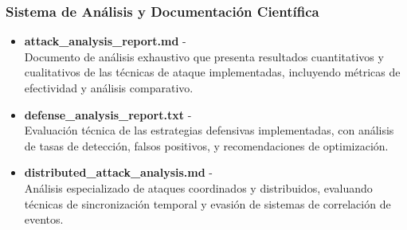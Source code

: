 \subsubsection*{Sistema de Análisis y Documentación Científica}
\begin{itemize}
    \item \textbf{attack\_analysis\_report.md} -  \\
    Documento de análisis exhaustivo que presenta resultados cuantitativos y cualitativos de las técnicas de ataque implementadas, incluyendo métricas de efectividad y análisis comparativo.
    
    \item \textbf{defense\_analysis\_report.txt} -  \\
    Evaluación técnica de las estrategias defensivas implementadas, con análisis de tasas de detección, falsos positivos, y recomendaciones de optimización.
    
    \item \textbf{distributed\_attack\_analysis.md} -  \\
    Análisis especializado de ataques coordinados y distribuidos, evaluando técnicas de sincronización temporal y evasión de sistemas de correlación de eventos.
\end{itemize}

